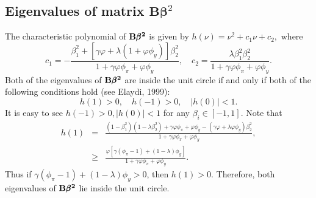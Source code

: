 \begin{appendix}
\section{Eigenvalues of matrix ${\pmb B}{\pmb\beta}^2$} \label{apdix_deter}
The characteristic polynomial of $\bf B\pmb\beta^2$ is given by
$h(\nu)=\nu^2+c_1\nu+c_2,$
where
$$c_1=-\frac{\beta_1^2+[\gamma\varphi+\lambda(1+\varphi\phi_y)]\beta_2^2}{1+\gamma\varphi\phi_\pi+\varphi\phi_y},\quad c_2=\frac{\lambda\beta_1^2\beta_2^2}{1+\gamma\varphi\phi_\pi+\varphi\phi_y}.$$
Both of the eigenvalues of $\bf B\pmb\beta^2$ are inside the unit circle if
and only if both of the following conditions hold (see Elaydi,
1999):
$$h(1)>0,\quad h(-1)>0, \quad|h(0)|<1.$$
It is easy to see $h(-1)>0, |h(0)|<1$ for any $\beta_i\in[-1,1]$. Note that
\begin{eqnarray*}
h(1)&=&\frac{(1-\beta_1^2)(1-\lambda\beta_2^2)+\gamma\varphi\phi_\pi+\varphi\phi_y-(\gamma\varphi+\lambda\varphi\phi_y)\beta_2^2}{1+\gamma\varphi\phi_\pi+\varphi\phi_y},\\
&\geq&\frac{\varphi[\gamma(\phi_\pi-1)+(1-\lambda)\phi_y]}{1+\gamma\varphi\phi_\pi+\varphi\phi_y}.
\end{eqnarray*}
Thus if $\gamma(\phi_\pi-1)+(1-\lambda)\phi_y>0$, then $h(1)>0$. Therefore, both eigenvalues of $\bf B\pmb\beta^2$ lie inside the unit
circle.



\end{appendix}
